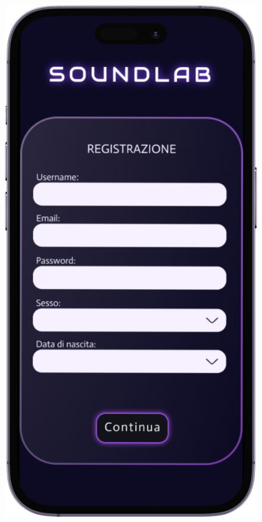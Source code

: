\documentclass{article}
\begin{document}
			\begin{figure}[htbp]
				\centering
				\begin{minipage}{0.18\textwidth}
					\includegraphics[width=\textwidth]{Immagini/foto1}
				\end{minipage}

\end{figure}
\end{document}
